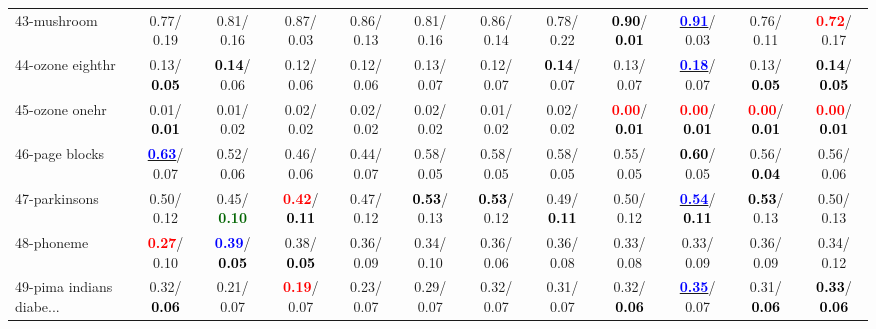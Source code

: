 \begin{table}[h]
\begin{center}
{\begin{tabular}{lc|c|c|c|c|c|c|c|c|c|c}
43-mushroom &   0.77/  0.19 &   0.81/  0.16 &   0.87/  0.03 &   0.86/  0.13 &   0.81/  0.16 &   0.86/  0.14 &   0.78/  0.22 & \textcolor{black}{\textbf{  0.90}}/\textcolor{black}{\textbf{  0.01}} & \underline{\textcolor{blue}{\textbf{  0.91}}}/  0.03 &   0.76/  0.11 & \textcolor{red}{\textbf{  0.72}}/  0.17 \\
44-ozone eighthr &   0.13/\textcolor{black}{\textbf{  0.05}} & \textcolor{black}{\textbf{  0.14}}/  0.06 &   0.12/  0.06 &   0.12/  0.06 &   0.13/  0.07 &   0.12/  0.07 & \textcolor{black}{\textbf{  0.14}}/  0.07 &   0.13/  0.07 & \underline{\textcolor{blue}{\textbf{  0.18}}}/  0.07 &   0.13/\textcolor{black}{\textbf{  0.05}} & \textcolor{black}{\textbf{  0.14}}/\textcolor{black}{\textbf{  0.05}} \\
45-ozone onehr &   0.01/\textcolor{black}{\textbf{  0.01}} &   0.01/  0.02 &   0.02/  0.02 &   0.02/  0.02 &   0.02/  0.02 &   0.01/  0.02 &   0.02/  0.02 & \textcolor{red}{\textbf{  0.00}}/\textcolor{black}{\textbf{  0.01}} & \textcolor{red}{\textbf{  0.00}}/\textcolor{black}{\textbf{  0.01}} & \textcolor{red}{\textbf{  0.00}}/\textcolor{black}{\textbf{  0.01}} & \textcolor{red}{\textbf{  0.00}}/\textcolor{black}{\textbf{  0.01}} \\
46-page blocks & \underline{\textcolor{blue}{\textbf{  0.63}}}/  0.07 &   0.52/  0.06 &   0.46/  0.06 &   0.44/  0.07 &   0.58/  0.05 &   0.58/  0.05 &   0.58/  0.05 &   0.55/  0.05 & \textcolor{black}{\textbf{  0.60}}/  0.05 &   0.56/\textcolor{black}{\textbf{  0.04}} &   0.56/  0.06 \\ \hline
47-parkinsons &   0.50/  0.12 &   0.45/\textcolor{darkgreen}{\textbf{  0.10}} & \textcolor{red}{\textbf{  0.42}}/\textcolor{black}{\textbf{  0.11}} &   0.47/  0.12 & \textcolor{black}{\textbf{  0.53}}/  0.13 & \textcolor{black}{\textbf{  0.53}}/  0.12 &   0.49/\textcolor{black}{\textbf{  0.11}} &   0.50/  0.12 & \underline{\textcolor{blue}{\textbf{  0.54}}}/\textcolor{black}{\textbf{  0.11}} & \textcolor{black}{\textbf{  0.53}}/  0.13 &   0.50/  0.13 \\
48-phoneme & \textcolor{red}{\textbf{  0.27}}/  0.10 & \textcolor{blue}{\textbf{  0.39}}/\textcolor{black}{\textbf{  0.05}} &   0.38/\textcolor{black}{\textbf{  0.05}} &   0.36/  0.09 &   0.34/  0.10 &   0.36/  0.06 &   0.36/  0.08 &   0.33/  0.08 &   0.33/  0.09 &   0.36/  0.09 &   0.34/  0.12 \\
49-pima indians diabe... &   0.32/\textcolor{black}{\textbf{  0.06}} &   0.21/  0.07 & \textcolor{red}{\textbf{  0.19}}/  0.07 &   0.23/  0.07 &   0.29/  0.07 &   0.32/  0.07 &   0.31/  0.07 &   0.32/\textcolor{black}{\textbf{  0.06}} & \underline{\textcolor{blue}{\textbf{  0.35}}}/  0.07 &   0.31/\textcolor{black}{\textbf{  0.06}} & \textcolor{black}{\textbf{  0.33}}/\textcolor{black}{\textbf{  0.06}} \\

\end{tabular}}
\end{center}
\end{table}
